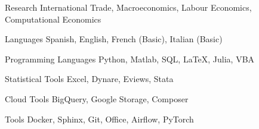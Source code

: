 

\begin{cvskills}

\cvskill
    {Research} %
    {International Trade, Macroeconomics, Labour Economics, Computational Economics} %

\cvskill
    {Languages} %
    {Spanish, English, French (Basic), Italian (Basic)} %

\cvskill
    {Programming Languages} %
    {Python, Matlab, SQL, LaTeX, Julia, VBA} %

\cvskill
    {Statistical Tools} %
    {Excel, Dynare, Eviews, Stata} %

\cvskill
    {Cloud Tools} %
    {BigQuery, Google Storage, Composer} %

\cvskill
    {Tools} %
    {Docker, Sphinx, Git, Office, Airflow, PyTorch} %

\end{cvskills}
